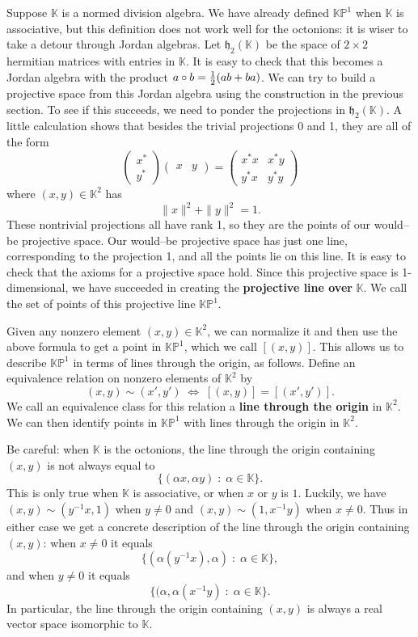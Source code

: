 \documentclass[12pt]{article}
\newcommand\K{{\mathbb K}}
\newcommand\KP{{\mathbb {KP}}}
\newcommand{\h}{{\mathfrak {h}}}
\begin{document}
Suppose $\K$ is a normed division algebra.  We have already defined 
$\KP^1$ when $\K$ is associative, but this definition does not work well 
for the octonions: it is wiser to take a detour through Jordan 
algebras.  Let $\h_2(\K)$ be the space of $2 \times 2$ hermitian 
matrices with entries in $\K$.  It is easy to check that this becomes a 
Jordan algebra with the product $a \circ b = {1\over 2}(ab + ba)$.  We 
can try to build a projective space from this Jordan algebra using the 
construction in the previous section.  To see if this 
succeeds, we need to ponder the projections in $\h_2(\K)$.  A little 
calculation shows that besides the trivial projections 0 and 1, they 
are all of the form  
\[   
\left( \begin{array}{c}  x^* \\ y^* \end{array} \right)  
\left( \begin{array}{cc} \! x  &  y \! \end{array} \right)  
=  
\left( \begin{array}{cc}  
                         x^* x  & x^* y    \\  
                         y^* x  & y^* y 
\end{array} \right)  
\] 
where $(x,y) \in \K^2$ has 
\[         \|x\|^2 + \|y\|^2 = 1.   \] 
These nontrivial projections all have rank 1, so they are the points of 
our would--be projective space.  Our would--be projective space has just 
one line, corresponding to the projection 1, and all the points lie on 
this line.  It is easy to check that the axioms for a projective space 
hold.  Since this projective space is 1-dimensional, we have succeeded 
in creating the {\bf projective line over} $\K$.  We call the set of 
points of this projective line $\KP^1$. 
 
Given any nonzero element $(x,y) \in \K^2$, we can normalize it and then 
use the above formula to get a point in $\KP^1$, which we call 
$[(x,y)]$.   This allows us to describe $\KP^1$ in terms 
of lines through the origin, as follows.  Define an equivalence relation 
on nonzero elements of $\K^2$ by 
\[        (x,y) \sim (x',y') \; \iff \; [(x,y)] = [(x',y')]  .\] 
We call an equivalence class for this relation a {\bf line through the 
origin} in $\K^2$.  We can then identify  points in $\KP^1$ with lines 
through the origin in $\K^2$.  
 
Be careful: when $\K$ is the octonions, the line through the 
origin containing $(x,y)$ is not always equal to 
\[    \{(\alpha x, \alpha y)\; \colon \; \alpha \in \K\}.   \] 
This is only true when $\K$ is associative, or when $x$ or $y$ is 
$1$.   Luckily, we have $(x,y) \sim (y^{-1}x,1)$ when $y \ne 0$ and 
$(x,y) \sim (1,x^{-1}y)$ when $x \ne 0$.  Thus in either case we get a 
concrete description of the line through the origin containing $(x,y)$: 
when $x \ne 0$ it equals 
\[    \{(\alpha(y^{-1}x), \alpha)\; \colon \; \alpha \in \K\} ,  \] 
and when $y \ne 0$ it equals 
\[    \{(\alpha, \alpha(x^{-1}y)\; \colon \; \alpha \in \K\} .  \] 
In particular, the line through the origin containing $(x,y)$ is  
always a real vector space isomorphic to $\K$. 
 
\end{document}

